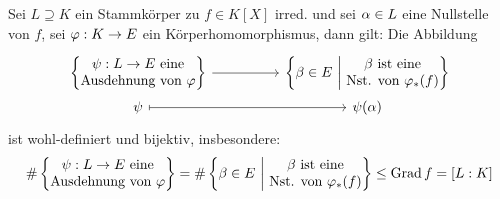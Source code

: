 \documentclass[a4paper]{report}
\begin{document}
\begin{lemm}
  Sei $L \supseteq K$ ein Stammkörper zu $f \in K[X]$ irred. und sei $\alpha \in L$ eine Nullstelle von $f$, sei $\varphi: K \to E$ ein Körperhomomorphismus, dann gilt: Die Abbildung
\[
\begin{tikzcd}[row sep = 0.5]
\l\{\begin{matrix} \psi: L \to E \text{ eine}\\ \text{Ausdehnung von } \ph \end{matrix}\r\} \arrow[rr] &  & \l\{\b \in E \ \middle \vert\  \begin{matrix}         \b \text{ ist eine} \\ \text{Nst. von } \ph_{*}(f)   \end{matrix}\r\} \\
\psi \arrow[rr, maps to]                                                                               &  & \psi(\alpha)
\end{tikzcd}
\]
ist wohl-definiert und bijektiv, insbesondere:
\[\# \left\{\begin{matrix} \psi: L \to E \text{ eine}\\ \text{Ausdehnung von } \varphi \end{matrix}\right\} = \# \left\{\beta \in E \ \middle \vert\  \begin{matrix}         \beta \text{ ist eine} \\ \text{Nst. von } \varphi_{*}(f)   \end{matrix}\right\} \le \operatorname{Grad} f = [L : K]\]
\end{lemm}
\end{document}
